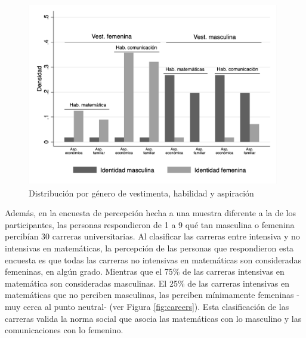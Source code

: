 \begin{figure}[htbp]
    \centering
    \includegraphics[width=11cm]{Images/dist.png}
    \caption{Distribución por género de vestimenta, habilidad y aspiración}
    \label{fig:distribuciones_expresiones}
    \begin{singlespace}
    \end{singlespace}
\end{figure}

Además, en la encuesta de percepción hecha a una muestra diferente a la de los participantes, las personas respondieron de 1 a 9 qué tan masculina o femenina percibían 30 carreras universitarias. Al clasificar las carreras entre intensiva y no intensivas en matemáticas, la percepción de las personas que respondieron esta encuesta es que todas las carreras no intensivas en matemáticas son consideradas femeninas, en algún grado. Mientras que el 75\% de las carreras intensivas en matemática son consideradas masculinas. El 25\% de las carreras intensivas en matemáticas que no perciben masculinas, las perciben mínimamente femeninas -muy cerca al punto neutral- (ver Figura \ref{fig:careers}). Esta clasificación de las carreras valida la norma social que asocia las matemáticas con lo masculino y las comunicaciones con lo femenino.

